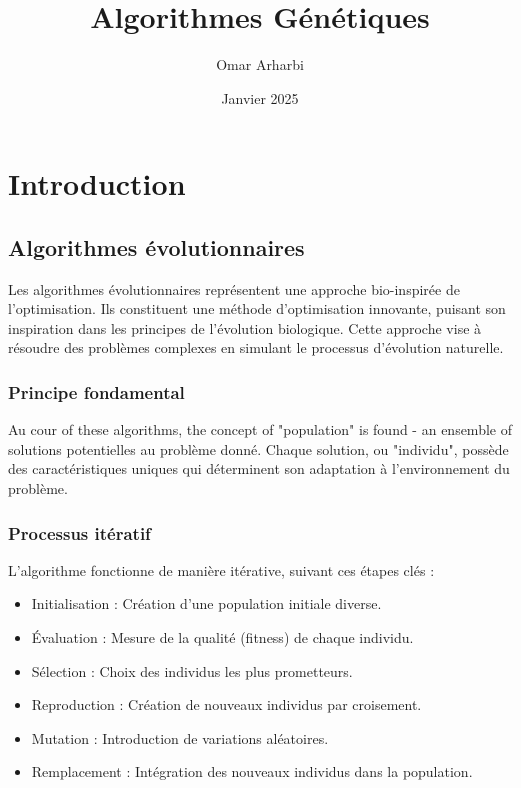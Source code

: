 \documentclass{article}
\title{Algorithmes Génétiques}
\author{Omar Arharbi}
\date{Janvier 2025}
\begin{document}
\maketitle

\tableofcontents  %
\newpage  %

\section{Introduction}
\subsection{Algorithmes évolutionnaires}

Les algorithmes évolutionnaires représentent une approche bio-inspirée de l'optimisation. Ils constituent une méthode d'optimisation innovante, puisant son inspiration dans les principes de l'évolution biologique. Cette approche vise à résoudre des problèmes complexes en simulant le processus d'évolution naturelle.

\subsubsection{Principe fondamental}

Au cour of these algorithms, the concept of "population" is found - an ensemble of solutions potentielles au problème donné. Chaque solution, ou "individu", possède des caractéristiques uniques qui déterminent son adaptation à l'environnement du problème.

\subsubsection{Processus itératif}

L'algorithme fonctionne de manière itérative, suivant ces étapes clés :

\begin{itemize}
    \item Initialisation : Création d'une population initiale diverse.
    \item Évaluation : Mesure de la qualité (fitness) de chaque individu.
    \item Sélection : Choix des individus les plus prometteurs.
    \item Reproduction : Création de nouveaux individus par croisement.
    \item Mutation : Introduction de variations aléatoires.
    \item Remplacement : Intégration des nouveaux individus dans la population.
\end{itemize}
\end{document}
